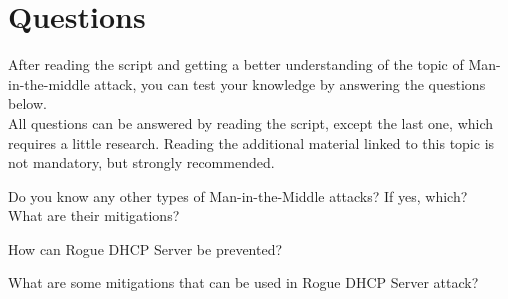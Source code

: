 \chapter{Questions}
After reading the script and getting a better understanding of the topic of Man-in-the-middle attack, you can test your knowledge by answering the questions below. \\
All questions can be answered by reading the script, except the last one, which requires a little research. Reading the additional material linked to this topic is not mandatory, but strongly recommended.
\begin{question}[Question]
   Do you know any other types of Man-in-the-Middle attacks? If yes, which? \\
   What are their mitigations?
\end{question}
\begin{question}[Answer]
    \vspace{3cm}
\end{question}

\begin{question}[Question]
    How can Rogue DHCP Server be prevented?
\end{question}
\begin{question}[Answer]
    \vspace{3cm}
\end{question}

\begin{question}[Question]
    What are some mitigations that can be used in Rogue DHCP Server attack?
\end{question}
\begin{question}[Answer]
    \vspace{3cm}
\end{question}

